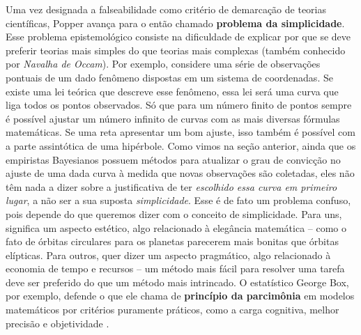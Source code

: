 \documentclass[./main.tex]{subfiles}
\begin{document}
\par Uma vez designada a falseabilidade como critério de demarcação de teorias científicas, Popper avança para o então chamado \textbf{problema da simplicidade}. Esse problema epistemológico consiste na dificuldade de explicar por que se deve preferir teorias mais simples do que teorias mais complexas (também conhecido por \textit{Navalha de Occam}). Por exemplo, considere uma série de observações pontuais de um dado fenômeno dispostas em um sistema de coordenadas. Se existe uma lei teórica que descreve esse fenômeno, essa lei será uma curva que liga todos os pontos observados. Só que para um número finito de pontos sempre é possível ajustar um número infinito de curvas com as mais diversas fórmulas matemáticas. Se uma reta apresentar um bom ajuste, isso também é possível com a parte assintótica de uma hipérbole. Como vimos na seção anterior, ainda que os empiristas Bayesianos possuem métodos para atualizar o grau de convicção no ajuste de uma dada curva à medida que novas observações são coletadas, eles não têm nada a dizer sobre a justificativa de ter \textit{escolhido essa curva em primeiro lugar}, a não ser a sua suposta \textit{simplicidade}. Esse é de fato um problema confuso, pois depende do que queremos dizer com o conceito de simplicidade. Para uns, significa um aspecto estético, algo relacionado à elegância matemática – como o fato de órbitas circulares para os planetas parecerem mais bonitas que órbitas elípticas. Para outros, quer dizer um aspecto pragmático, algo relacionado à economia de tempo e recursos – um método mais fácil para resolver uma tarefa deve ser preferido do que um método mais intrincado. O estatístico George Box, por exemplo, defende o que ele chama de \textbf{princípio da parcimônia} em modelos matemáticos por critérios puramente práticos, como a carga cognitiva, melhor precisão e objetividade \cite{Box1979}.
\end{document}
